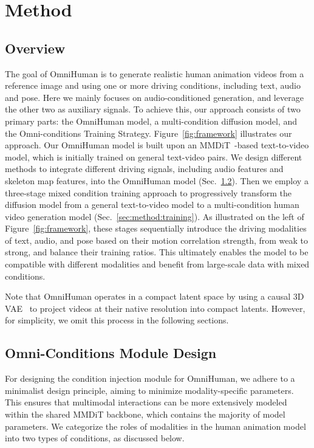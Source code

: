\section{Method}
\label{headings}



\subsection{Overview}

The goal of OmniHuman is to generate realistic human animation videos from a reference image and using one or more driving conditions, including text, audio and pose. Here we mainly focuses on audio-conditioned generation, and leverage the other two as auxiliary signals.
To achieve this,  our approach consists of two primary parts: the OmniHuman model, a multi-condition diffusion model, and the Omni-conditions Training Strategy. Figure~\ref{fig:framework} illustrates our approach. Our OmniHuman model is built upon an MMDiT~\cite{sd3,dit,lin2025apt,navit}-based text-to-video model, which is initially trained on general text-video pairs. We design different methods to integrate different driving signals, including audio features and skeleton map features, into the OmniHuman model (Sec.~\ref{sec:method:condition}). Then we employ a three-stage mixed condition training approach to progressively transform the diffusion model from a general text-to-video model to a multi-condition human video generation model (Sec.~\ref{sec:method:training}). As illustrated on the left of Figure~\ref{fig:framework}, these stages sequentially introduce the driving modalities of text, audio, and pose based on their motion correlation strength, from weak to strong, and balance their training ratios. This ultimately enables the model to be compatible with different modalities and benefit from large-scale data with mixed conditions. 

Note that OmniHuman operates in a compact latent space by using a causal 3D VAE~\cite{opensora} to project videos at their native resolution into compact latents. However, for simplicity, we omit this process in the following sections.


   

\subsection{Omni-Conditions Module Design}
\label{sec:method:condition}
For designing the condition injection module for OmniHuman, we adhere to a minimalist design principle, aiming to minimize modality-specific parameters. This ensures that multimodal interactions can be more extensively modeled within the shared MMDiT backbone, which contains the majority of model parameters. We categorize the roles of modalities in the human animation model into two types of conditions, as discussed below. 


